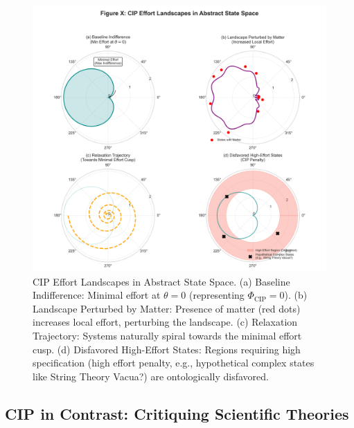 \documentclass[11pt, a4paper]{article}
\newcommand{\subt}[1]{\mathrm{#1}}
\begin{document}
{{{\begin{figure}[H]
    \centering
    \includegraphics[width=\textwidth]{CIP_StateSpace.png}
    \caption[CIP Effort Landscapes in Abstract State Space]{CIP Effort Landscapes in Abstract State Space. (a) Baseline Indifference: Minimal effort at $\theta=0$ (representing $\Phi_{\subt{CIP}}=0$). (b) Landscape Perturbed by Matter: Presence of matter (red dots) increases local effort, perturbing the landscape. (c) Relaxation Trajectory: Systems naturally spiral towards the minimal effort cusp. (d) Disfavored High-Effort States: Regions requiring high specification (high effort penalty, e.g., hypothetical complex states like String Theory Vacua?) are ontologically disfavored.}
    \label{fig:state_space}
\end{figure}


\subsection{CIP in Contrast: Critiquing Scientific Theories}

}}}
\end{document}
